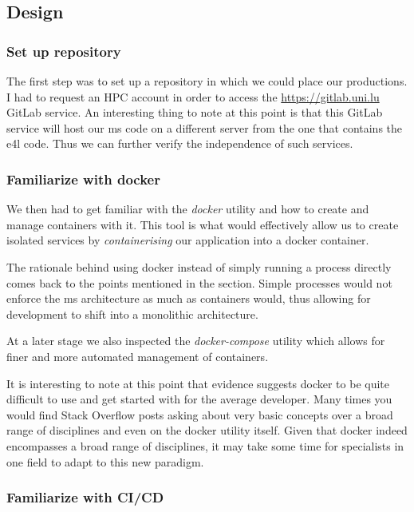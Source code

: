\subsection{Design}

\subsubsection{Set up repository}

The first step was to set up a repository in which we could place our
productions. I had to request an HPC account in order to access the
\url{https://gitlab.uni.lu} GitLab service. An interesting thing to
note at this point is that this GitLab service will host our
\gls{ms} code on a different server from the one that contains the
\gls{e4l} code. Thus we can further verify the independence of such
services.

\subsubsection{Familiarize with docker}

We then had to get familiar with the \textit{docker} utility and how
to create and manage containers with it. This tool is what would
effectively allow us to create isolated services by \emph{containerising} our
application into a docker container.

The rationale behind using docker instead of simply running a process
directly comes back to the points mentioned in the
 section. Simple processes would not
enforce the \gls{ms} architecture as much as containers would, thus
allowing for development to shift into a monolithic architecture.

At a later stage we also inspected the \textit{docker-compose}
utility which allows for finer and more automated management of
containers.

It is interesting to note at this point that evidence suggests
docker to be quite difficult to use and get started with for the
average developer. Many times you would find Stack Overflow posts
asking about very basic concepts over a broad range of disciplines and
even on the docker utility itself. \cite{docker-so} Given that docker
indeed encompasses a broad range of disciplines, it may take some time
for specialists in one field to adapt to this new paradigm.

\subsubsection{Familiarize with CI/CD}

